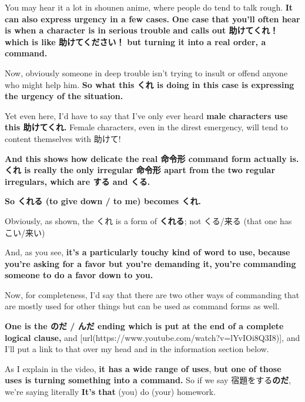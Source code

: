 You may hear it a lot in shounen anime, where people do tend to talk rough. {\bf It can also express urgency in a few cases.} {\bf One case that you'll often hear is when a character is in serious trouble} {\bf and calls out 助けてくれ！ which is like 助けてください！} {\bf but turning it into a real order, a command.}

Now, obviously someone in deep trouble isn't trying to insult or offend anyone who might help him. {\bf So what this くれ is doing in this case is expressing the urgency of the situation.}

Yet even here, I'd have to say that I've only ever heard {\bf male characters use this 助けてくれ.} Female characters, even in the direst emergency, will tend to content themselves with 助けて!

{\bf And this shows how delicate the real 命令形 command form actually is.} {\bf くれ is really the only irregular 命令形 apart from} {\bf the two regular irregulars, which are する and くる.}

{}

{\bf So くれる (to give down / to me) becomes くれ.}

Obviously, as shown, the くれ is a form of {\bf くれる}; not くる/来る (that one has こい/来い)

\thinrule

And, as you see, {\bf it's a particularly touchy kind of word to use,} {\bf because you're asking for a favor but you're demanding it,} {\bf you're commanding someone to do a favor down to you.}

Now, for completeness, I'd say that there are two other ways of commanding that are mostly used for other things but can be used as command forms as well.

\stopsectionlevel

\startsectionlevel[title={のだ / んだ ending},reference={のだ-んだ-ending}]

{\bf One is the のだ / んだ ending which is put at the end of a complete logical clause,} and [url(https://www.youtube.com/watch?v=lYvIOi8Q3I8)], and I'll put a link to that over my head and in the information section below.

As I explain in the video, {\bf it has a wide range of uses}, {\bf but one of those uses is turning something into a command.} So if we say 宿題をする{\bf のだ}, we're saying literally {\bf It's that} (you) do (your) homework.

